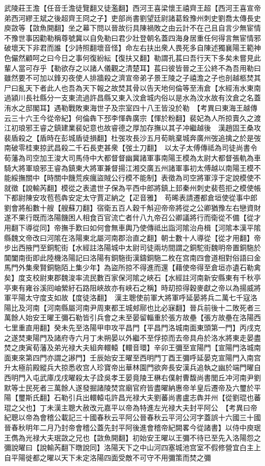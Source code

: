 武陵莊王澹【任音壬澹徒覽翻又徒濫翻】西河王喜梁懷王禧齊王超【西河王喜宣帝弟西河繆王斌之後超齊王冏之子】吏部尚書劉望廷尉諸葛銓豫州刺史劉喬太傳長史庾敳等【敳魚開翻】坐之幕下問以晉故衍具陳禍敗之由云計不在己且自言少無宦情不豫世事因勸勒稱尊號冀以自免勒曰君少壯登朝名蓋四海身居重任何得言無宦情邪破壞天下非君而誰【少詩照翻壞音怪】命左右扶出衆人畏死多自陳述獨襄陽王範神色儼然顧呵之曰今日之事何復紛紜【復扶又翻】勒謂孔萇曰吾行天下多矣未嘗見此輩人當可存乎【勒欲存之以諸人儀觀之清楚耳】萇曰彼皆晉之王公終不為吾用勒曰雖然要不可加以鋒刃夜使人排牆殺之濟宣帝弟子景王陵之子禧澹之子也剖越柩焚其尸曰亂天下者此人也吾為天下報之故焚其骨以告天地何倫等至洧倉【水經洧水東南過潁川長社縣分一支東流過許昌縣又東入汶倉城内俗以是水為汶水故有汶倉之名蓋洧水之邸閣耳】遇勒戰敗東海世子及宗室四十八王皆没於勒　【考異曰東海王越傳云三十六王今從帝紀】何倫犇下邳李惲犇廣宗【惲於粉翻】裴妃為人所掠賣久之渡江初琅邪王睿之鎮建業裴妃意也故睿德之厚加存撫以其子冲繼越後　漢趙固王桑攻裴盾殺之【盾時在彭城盾徒損翻】杜弢攻長沙五月荀眺棄城奔廣州弢追擒之於是弢南破零桂東掠武昌殺二千石長吏甚衆【弢土刀翻】　以太子太傅傳祗為司徒尚書令荀藩為司空加王浚大司馬侍中大都督督幽冀諸軍事南陽王模為太尉大都督張軌為車騎大將軍琅邪王睿為鎮東大將軍兼督揚江湘交廣五州諸軍事初太傅越以南陽王模不能綏撫關中【時關中饑荒疾癘盜賊公行模不能制】表徵為司空將軍淳于定說模使不就徵【說輸芮翻】模從之表遣世子保為平西中郎將鎮上邽秦州刺史裴苞拒之模使帳下都尉陳安攻苞苞犇安定太守賈疋納之【疋音雅】　苟晞表請遷都倉垣使從事中郎劉會將船數十艘【艘蘇刀翻】宿衛五百人穀千斛迎帝帝將從之公卿猶豫左右戀資財遂不果行既而洛陽饑困人相食百官流亡者什八九帝召公卿議將行而衛從不備【從才用翻下導從同】帝撫手歎曰如何會無車輿乃使傳祗出詣河隂治舟楫【河隂本漢平隂縣魏文帝改曰河隂在洛陽東北屬河南郡治直之翻】朝士數十人導從【從才用翻】帝步出西掖門至銅駝街【水經註洛陽城中太尉司徒兩坊間謂之銅駝街魏明帝置銅駞於閶闔南街即此陸機洛陽記曰洛陽有銅駞街漢鑄銅駞二枚在宫南四會道相對俗語曰金馬門外集衆賢銅駞陌上集少年】為盜所掠不得進而還【藉使帝得至倉垣亦遺石勒禽矣】度支校尉東郡魏浚率流民數百家保河隂之峽石【水經註河南新安縣東有千秋亭亭東有雍谷溪囘岫縈紆石路阻峽故亦有峽石之稱】時刧掠得穀麥獻之帝以為揚威將軍平陽太守度支如故【度徒洛翻】　漢主聰使前軍大將軍呼延晏將兵二萬七千寇洛陽比及河南【河南縣屬河南尹周東都王城郟鄏也比必寐翻】晉兵前後十二敗死者三萬餘人始安王曜王彌石勒皆引兵會之未至晏留輜重於張方故壘【張方故壘在洛陽西七里重直用翻】癸未先至洛陽甲申攻平昌門【平昌門洛城南面東頭第一門】丙戌克之遂焚東陽門及諸府寺六月丁未朔晏以外繼不至俘掠而去帝具舟於洛水將東走晏盡焚之庚寅荀藩及弟光禄大夫組奔轘轅【轘音環】辛卯王彌至宣陽門【宣陽門洛城南面東來第四門亦謂之謻門】壬辰始安王曜至西明門丁酉王彌呼延晏克宣陽門入南宫升太極前殿縱兵大掠悉收宫人珍寶帝出華林園門欲奔長安漢兵追執之幽於端門曜自西明門入屯武庫戊戌曜殺太子詮吳孝王晏竟陵王楙右僕射曹馥尚書閭丘冲河南尹劉默等士民死者三萬餘人遂發掘諸陵焚宫廟官府皆盡曜納惠帝羊皇后遷帝及六璽於平陽【璽斯氏翻】石勒引兵出轘轅屯許昌光禄大夫劉蕃尚書盧志犇并州【從劉琨也蕃琨之父也】丁未漢主聰大赦改元嘉平以帝為特進左光禄大夫封平阿公　【考異曰帝紀聰以帝為會稽公載記三十國春秋云平阿公晉春秋云平河公河字蓋誤十六國三十國晉春秋明年二月乃封帝會稽公蓋先封平阿後進會稽帝紀闕畧今從諸書】以侍中庾珉王儁為光禄大夫珉敳之兄也【敳魚開翻】初始安王曜以王彌不待已至先入洛陽怨之彌說曜曰【說輸芮翻下暾說同】洛陽天下之中山河四塞城池宫室不假修營宜白主上自平陽徙都之曜以天下未定洛陽四面受敵不可守不用彌策而焚之彌